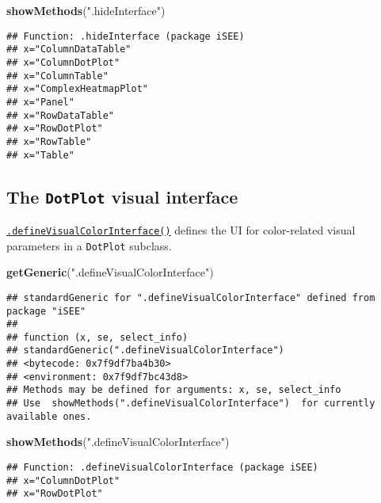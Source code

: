 \documentclass[
]{book}
\newenvironment{Shaded}{\begin{snugshade}}{\end{snugshade}}
\newcommand{\KeywordTok}[1]{\textcolor[rgb]{0.13,0.29,0.53}{\textbf{#1}}}
\newcommand{\NormalTok}[1]{#1}
\newcommand{\StringTok}[1]{\textcolor[rgb]{0.31,0.60,0.02}{#1}}
\begin{document}
\begin{Shaded}
\begin{Highlighting}[]
\KeywordTok{showMethods}\NormalTok{(}\StringTok{".hideInterface"}\NormalTok{)}
\end{Highlighting}
\end{Shaded}

\begin{verbatim}
## Function: .hideInterface (package iSEE)
## x="ColumnDataTable"
## x="ColumnDotPlot"
## x="ColumnTable"
## x="ComplexHeatmapPlot"
## x="Panel"
## x="RowDataTable"
## x="RowDotPlot"
## x="RowTable"
## x="Table"
\end{verbatim}

\hypertarget{the-dotplot-visual-interface}{%
\subsection{\texorpdfstring{The \texttt{DotPlot} visual interface}{The DotPlot visual interface}}\label{the-dotplot-visual-interface}}

\href{https://isee.github.io/iSEE/reference/visual-parameters-generics.html}{\texttt{.defineVisualColorInterface()}} defines the UI for color-related visual parameters in a \texttt{DotPlot} subclass.

\begin{Shaded}
\begin{Highlighting}[]
\KeywordTok{getGeneric}\NormalTok{(}\StringTok{".defineVisualColorInterface"}\NormalTok{)}
\end{Highlighting}
\end{Shaded}

\begin{verbatim}
## standardGeneric for ".defineVisualColorInterface" defined from package "iSEE"
## 
## function (x, se, select_info) 
## standardGeneric(".defineVisualColorInterface")
## <bytecode: 0x7f9df7ba4b30>
## <environment: 0x7f9df7bc43d8>
## Methods may be defined for arguments: x, se, select_info
## Use  showMethods(".defineVisualColorInterface")  for currently available ones.
\end{verbatim}

\begin{Shaded}
\begin{Highlighting}[]
\KeywordTok{showMethods}\NormalTok{(}\StringTok{".defineVisualColorInterface"}\NormalTok{)}
\end{Highlighting}
\end{Shaded}

\begin{verbatim}
## Function: .defineVisualColorInterface (package iSEE)
## x="ColumnDotPlot"
## x="RowDotPlot"
\end{verbatim}
\end{document}
